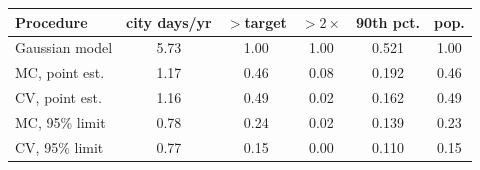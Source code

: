 \begin{tabular*}{\columnwidth}{@{\extracolsep{\fill}}lccccc@{}}
\toprule
Procedure & city days/yr & $>$target & $>2\times$ & 90th pct. & pop.\\
\midrule
Gaussian model & 5.73 & 1.00 & 1.00 & 0.521 & 1.00\\
MC, point est. & 1.17 & 0.46 & 0.08 & 0.192 & 0.46\\
CV, point est. & 1.16 & 0.49 & 0.02 & 0.162 & 0.49\\
MC, 95\% limit & 0.78 & 0.24 & 0.02 & 0.139 & 0.23\\
CV, 95\% limit & 0.77 & 0.15 & 0.00 & 0.110 & 0.15\\
\bottomrule
\end{tabular*}
